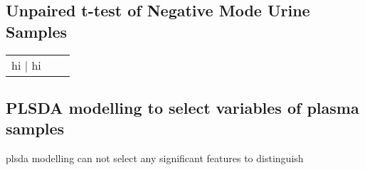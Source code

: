 \subsection{Unpaired t-test of Negative Mode Urine Samples}
\begin{tabular}{c|c|c}
	hi | hi
\end{tabular}

\subsection{PLSDA modelling to select variables of plasma samples}
plsda modelling can not select any significant features to distinguish 